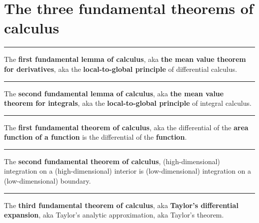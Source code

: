 \chapter{The three fundamental theorems of calculus}

\vs\hrule\vskip1pt
\theorem The {\bf first fundamental lemma of calculus}, aka {\bf the mean value theorem for derivatives}, aka the {\bf local-to-global principle} of differential calculus. \par

\vs\hrule\vskip1pt
\theorem The {\bf second fundamental lemma of calculus}, aka {\bf the mean value theorem for integrals}, aka the {\bf local-to-global principle} of integral calculus. \par

\vs\hrule\vskip1pt
\theorem The {\bf first fundamental theorem of calculus}, aka the differential of the {\bf area function of a function} is the differential of the {\bf function}. \par

\vs\hrule\vskip1pt
\theorem The {\bf second fundamental theorem of calculus}, (high-dimensional) integration on a (high-dimensional) interior is (low-dimensional) integration on a (low-dimensional) boundary. \par

\vs\hrule\vskip1pt
\theorem The {\bf third fundamental theorem of calculus}, aka {\bf Taylor's differential expansion}, aka Taylor's analytic approximation, aka Taylor's theorem. \par




